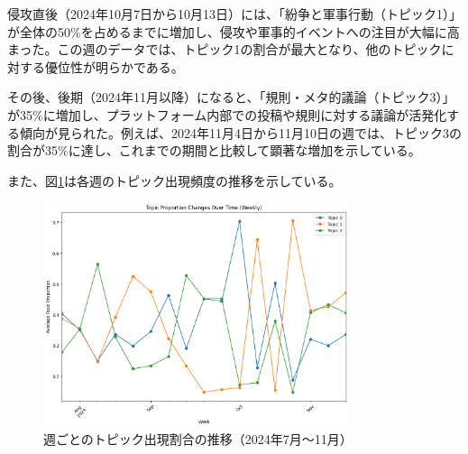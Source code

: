 \documentclass[11pt, a4j]{jreport}
\begin{document}
    侵攻直後（2024年10月7日から10月13日）には、「紛争と軍事行動（トピック1）」が全体の50\%を占めるまでに増加し、侵攻や軍事的イベントへの注目が大幅に高まった。この週のデータでは、トピック1の割合が最大となり、他のトピックに対する優位性が明らかである。
    
    その後、後期（2024年11月以降）になると、「規則・メタ的議論（トピック3）」が35\%に増加し、プラットフォーム内部での投稿や規則に対する議論が活発化する傾向が見られた。例えば、2024年11月4日から11月10日の週では、トピック3の割合が35\%に達し、これまでの期間と比較して顕著な増加を示している。

    \begin{table}[H]
    \centering
    \caption{各週におけるトピックの割合}
    \label{tab:topic_ratios}
    \end{table}    

    また、図\ref{fig:topic_trends}は各週のトピック出現頻度の推移を示している。

    \begin{figure}[H]
        \centering
        \includegraphics[width=0.8\textwidth]{topic_trends_plot.png}
        \caption{週ごとのトピック出現割合の推移（2024年7月～11月）}
        \label{fig:topic_trends}
    \end{figure}
\end{document}
